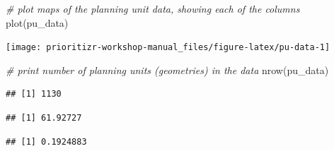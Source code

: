 \documentclass[
  12pt,
]{book}
\newenvironment{Shaded}{\begin{snugshade}}{\end{snugshade}}
\newcommand{\CommentTok}[1]{\textcolor[rgb]{0.56,0.35,0.01}{\textit{#1}}}
\newcommand{\FunctionTok}[1]{\textcolor[rgb]{0.00,0.00,0.00}{#1}}
\newcommand{\NormalTok}[1]{#1}
\newcommand{\SpecialCharTok}[1]{\textcolor[rgb]{0.00,0.00,0.00}{#1}}
\begin{document}
\begin{Shaded}
\begin{Highlighting}[]
\CommentTok{\# plot maps of the planning unit data, showing each of the columns}
\FunctionTok{plot}\NormalTok{(pu\_data)}
\end{Highlighting}
\end{Shaded}

\begin{center}\texttt{[image: prioritizr-workshop-manual\_files/figure-latex/pu-data-1]} \end{center}

\clearpage

\begin{Shaded}
\begin{Highlighting}[]
\CommentTok{\# print number of planning units (geometries) in the data}
\FunctionTok{nrow}\NormalTok{(pu\_data)}
\end{Highlighting}
\end{Shaded}

\begin{verbatim}
## [1] 1130
\end{verbatim}

\begin{Shaded}
\end{Shaded}

\begin{verbatim}
## [1] 61.92727
\end{verbatim}

\begin{Shaded}
\end{Shaded}

\begin{verbatim}
## [1] 0.1924883
\end{verbatim}

\begin{Shaded}
\end{Shaded}
\end{document}
